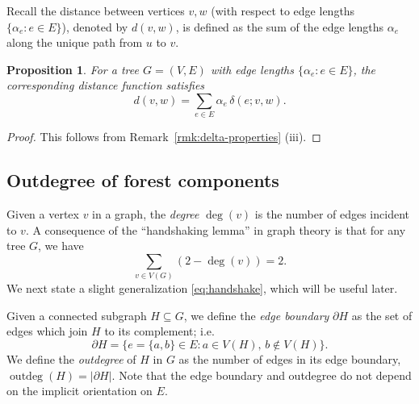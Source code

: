 \documentclass[12pt]{amsart}
\newtheorem{prop}[thm]{Proposition}
\theoremstyle{definition}
\DeclareMathOperator{\outdeg}{outdeg}
\begin{document}
Recall the distance between vertices $v,w$ (with respect to edge lengths $\{ \alpha_e \colon e \in E\}$), denoted by $d(v,w)$, is defined as the sum of the edge lengths $\alpha_e$ along the unique path from $u$ to $v$. 

\begin{prop}
\label{prop:distance-sum}
For a tree $G = (V,E)$ with edge lengths $\{\alpha_e \colon e \in E\}$, the corresponding distance function satisfies
\[ 
	d(v,w) = \sum_{e \in E} \alpha_e \, \delta(e; v,w) .
\]
\end{prop}
\begin{proof}
This follows from Remark~\ref{rmk:delta-properties} (iii).
\end{proof}


\subsection{Outdegree of forest components}
\label{sec:outdegree}

Given a vertex $v$ in a graph, the {\em degree} $\deg(v)$ is the number of edges incident to $v$.
A consequence of the ``handshaking lemma'' in graph theory is that for any tree $G$, we have
\begin{equation}
\label{eq:handshake}
	\sum_{v \in V(G)} (2 - \deg(v)) = 2.
\end{equation}
We next state a slight generalization \eqref{eq:handshake}, which will be useful later.

Given a connected subgraph $H \subseteq G$,
we define the {\em edge boundary} $\partial H$ as the set of edges which join $H$ to its complement; i.e.
\begin{equation}
	\partial H = \{ e = \{a,b\} \in E \colon a \in V(H),\, b \not\in V(H)\}.
\end{equation}
We define the {\em outdegree} of $H$ in $G$ as the number of edges in its edge boundary, $\outdeg(H) = |\partial H|$. 
Note that the edge boundary and outdegree do not depend on the implicit orientation on $E$.
\end{document}
